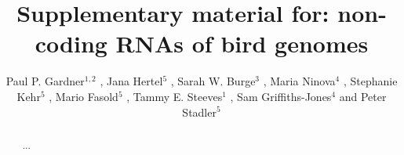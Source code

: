 \documentclass[10pt]{bmc_article}
\newenvironment{bmcformat}{\begin{raggedright}\baselineskip20pt\sloppy\setboolean{publ}{false}}{\end{raggedright}\baselineskip20pt\sloppy}
\begin{document}
\begin{bmcformat}

\title{Supplementary material for: non-coding RNAs of bird genomes}

\author{
Paul P. Gardner\correspondingauthor$^{1,2}$
,
Jana Hertel$^5$
,
Sarah W. Burge$^3$
,
Maria Ninova$^4$
,
Stephanie Kehr$^5$
,
Mario Fasold$^5$
,
Tammy E. Steeves$^1$
,
Sam Griffiths-Jones$^4$
and
Peter Stadler\correspondingauthor$^5$
}
\address{
\iid(1) School of Biological Sciences, University of Canterbury, Private Bag 4800, Christchurch, New Zealand.
\iid(2) Biomolecular Interaction Centre, University of Canterbury, Private Bag 4800, Christchurch, New Zealand.
\iid(3) European Molecular Biology Laboratory, European Bioinformatics Institute, Hinxton, Cambridge, CB10 1SD, UK.
\iid(4) Faculty of Life Sciences, University of Manchester, Manchester, United Kingdom.
\iid(5) Bioinformatics Group, Department of Computer Science; and Interdisciplinary Center for Bioinformatics, University of Leipzig, H{\"a}rtelstrasse 16-18, D-04107 Leipzig, Germany
}

\maketitle

\begin{abstract}
...
\end{abstract}



 

\end{bmcformat}
\end{document}
